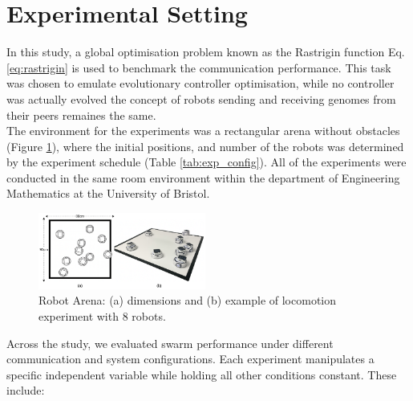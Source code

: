 \documentclass[conference]{IEEEtran}
\begin{document}


\section{Experimental Setting}

In this study, a global optimisation problem known as the Rastrigin function Eq. \ref{eq:rastrigin} is used to benchmark the communication performance. This task was chosen to emulate evolutionary controller optimisation, while no controller was actually evolved the concept of robots sending and receiving genomes from their peers remaines the same.\\ 

The environment for the experiments was a rectangular arena without obstacles (Figure \ref{fig:arena}), where the initial positions, and number of the robots was determined by the experiment schedule (Table \ref{tab:exp_config}). All of the experiments were conducted in the same room environment within the department of Engineering Mathematics at the University of Bristol.

\begin{figure}[H]
    \centering
    \includegraphics[width=0.49\textwidth]{arena.png}
    \caption{Robot Arena: (a) dimensions and (b) example of locomotion experiment with 8 robots.}
    \label{fig:arena}
\end{figure}

Across the study, we evaluated swarm performance under different communication and system configurations. Each experiment manipulates a specific independent variable while holding all other conditions constant. These include:\\
\end{document}
